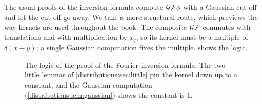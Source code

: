 The usual proofs of the inversion formula compute $\mathcal{G}\mathcal{F}\phi$ with a Gaussian
cut-off and let the cut-off go away. We take a more structural route, which previews
the way kernels are used throughout the book. The composite $\mathcal{G}\mathcal{F}$ commutes
with translations and with multiplication by $x_j$, so its kernel must be a multiple of
$\delta(x-y)$; a single Gaussian computation fixes the multiple.
 shows the logic.

\begin{figure}[htbp]
\centering
{}
\caption{The logic of the proof of the Fourier inversion formula. The two little lemmas
of \cref{distributions:sec:little} pin the kernel down up to a constant, and the
Gaussian computation (\cref{distributions:lem:gaussian}) shows the constant is $1$.}
\label{distributions:fig:inversion}
\end{figure}

